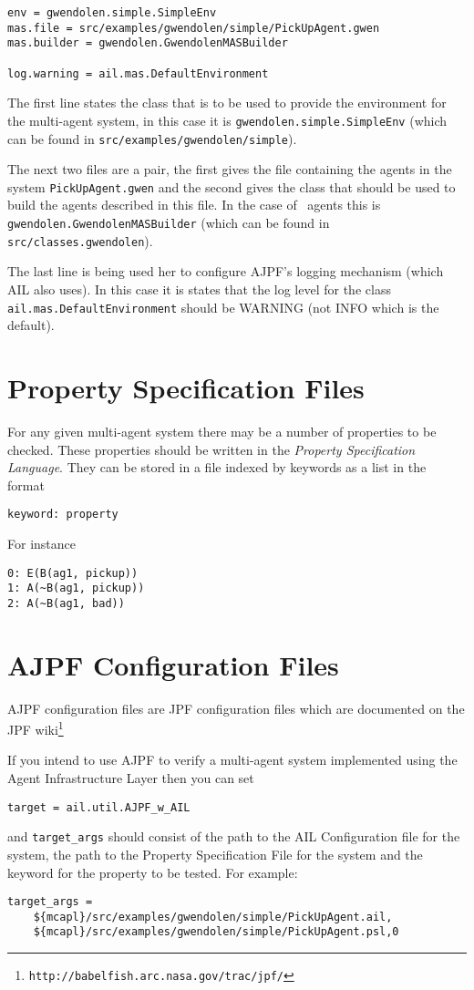 \begin{lstlisting}
env = gwendolen.simple.SimpleEnv
mas.file = src/examples/gwendolen/simple/PickUpAgent.gwen
mas.builder = gwendolen.GwendolenMASBuilder

log.warning = ail.mas.DefaultEnvironment
\end{lstlisting}

The first line states the class that is to be used to provide the environment for the multi-agent system, in this case it is \texttt{gwendolen.simple.SimpleEnv} (which can be found in \texttt{src/examples/gwendolen/simple}).

The next two files are a pair, the first gives the file containing the agents in the system \texttt{PickUpAgent.gwen} and the second gives the class that should be used to build the agents described in this file.  In the case of \gwendolen\ agents this is \texttt{gwendolen.GwendolenMASBuilder} (which can be found in \texttt{src/classes.gwendolen}).

The last line is being used her to configure AJPF's logging mechanism (which AIL also uses).  In this case it is states that the log level for the class \texttt{ail.mas.DefaultEnvironment} should be WARNING (not INFO which is the default).

\section{Property Specification Files}

For any given multi-agent system there may be a number of properties to be checked.  These properties should be written in the \emph{Property Specification Language}.  They can be stored in a file indexed by keywords as a list in the format

\texttt{keyword: property}

For instance
\begin{lstlisting}
0: E(B(ag1, pickup))
1: A(~B(ag1, pickup))
2: A(~B(ag1, bad))
\end{lstlisting}

\section{AJPF Configuration Files}
AJPF configuration files are JPF configuration files which are documented on the JPF wiki\footnote{\texttt{http://babelfish.arc.nasa.gov/trac/jpf/}}

If you intend to use AJPF to verify a multi-agent system implemented using the Agent Infrastructure Layer then you can set

\texttt{target = ail.util.AJPF\_w\_AIL}

and \texttt{target\_args} should consist of the path to the AIL Configuration file for the system, the path to the Property Specification File for the system and the keyword for the property to be tested.  For example: 

\begin{lstlisting}
target_args = 
    ${mcapl}/src/examples/gwendolen/simple/PickUpAgent.ail, 
    ${mcapl}/src/examples/gwendolen/simple/PickUpAgent.psl,0
\end{lstlisting}
